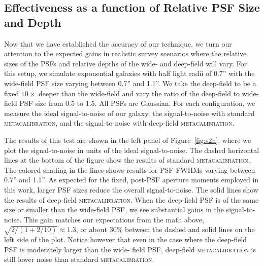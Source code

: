 \documentclass[twocolumn]{openjournal}
\makeatletter
\newcommand{\mcal}{\textsc{metacalibration}\@\xspace}
\makeatother
\begin{document}
\subsection{Effectiveness as a function of Relative PSF Size and Depth}\label{sec:sizedepth}

Now that we have established the accuracy of our technique, we turn our attention to the
expected gains in realistic survey scenarios where the relative sizes of the PSFs and
relative depths of the wide- and deep-field will vary. For this setup, we simulate
exponential galaxies with half light radii of 0.7'' with the wide-field PSF size varying
between 0.7'' and 1.1''. We take the deep-field to be a fixed $10\times$ deeper than the
wide-field and vary the ratio of the deep-field to wide-field PSF size from 0.5 to 1.5.
All PSFs are Gaussian. For each configuration, we measure the ideal signal-to-noise of
our galaxy, the signal-to-noise with standard \mcal, and the signal-to-noise with
deep-field \mcal.

The results of this test are shown in the left panel of Figure~\ref{fig:s2n}, where we
plot the signal-to-noise in units of the ideal signal-to-noise. The dashed horizontal
lines at the bottom of the figure show the results of standard \mcal. The colored
shading in the lines shows results for PSF FWHMs varying between 0.7'' and 1.1''. As
expected for the fixed, post-PSF aperture moments employed in this work, larger PSF
sizes reduce the overall signal-to-noise. The solid lines show the results of deep-field
\mcal. When the deep-field PSF is of the same size or smaller than the wide-field PSF,
we see substantial gains in the signal-to-noise. This gain matches our expectations from
the math above, $\sqrt{2/(1 + 2/10)}\approx1.3$, or about 30\% between the dashed and
solid lines on the left side of the plot. Notice however that even in the case where the
deep-field PSF is moderately larger than the wide- field PSF, deep-field \mcal is still
lower noise than standard \mcal.
\end{document}
